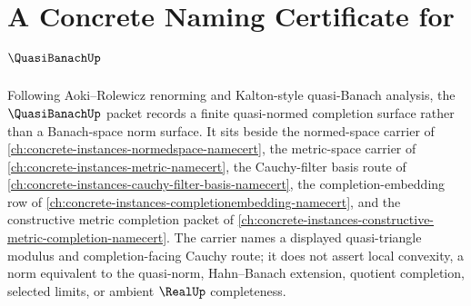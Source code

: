 \chapter{A Concrete Naming Certificate for $\QuasiBanachUp$}
\label{ch:concrete-instances-quasi-banach-namecert}

Following Aoki--Rolewicz renorming and Kalton-style quasi-Banach analysis, the $\QuasiBanachUp$ packet records a finite quasi-normed completion surface rather than a Banach-space norm surface. It sits beside the normed-space carrier of \autoref{ch:concrete-instances-normedspace-namecert}, the metric-space carrier of \autoref{ch:concrete-instances-metric-namecert}, the Cauchy-filter basis route of \autoref{ch:concrete-instances-cauchy-filter-basis-namecert}, the completion-embedding row of \autoref{ch:concrete-instances-completionembedding-namecert}, and the constructive metric completion packet of \autoref{ch:concrete-instances-constructive-metric-completion-namecert}. The carrier names a displayed quasi-triangle modulus and completion-facing Cauchy route; it does not assert local convexity, a norm equivalent to the quasi-norm, Hahn--Banach extension, quotient completion, selected limits, or ambient $\RealUp$ completeness.


